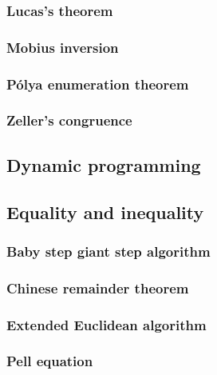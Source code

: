\documentclass[titlepage,a4paper,10pt]{article}
\begin{document}
\begin{multicols}{2}
\begin{spacing}{0.8}
{				\subsubsection{Lucas's theorem}
					
				\subsubsection{Mobius inversion}
					
				\subsubsection{Pólya enumeration theorem}
					
				\subsubsection{Zeller’s congruence}
					
			\subsection{Dynamic programming}
				
			\subsection{Equality and inequality}
				\subsubsection{Baby step giant step algorithm}
					
				\subsubsection{Chinese remainder theorem}
					
				\subsubsection{Extended Euclidean algorithm}
					
				\subsubsection{Pell equation}
					
}
\end{spacing}
\end{multicols}
\end{document}
